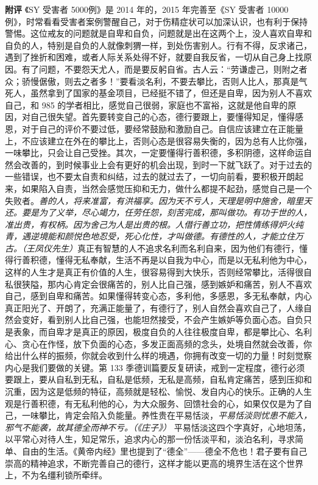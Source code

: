 \begin{case}
    \textbf{附评} 《SY 受害者 5000例》是 2014 年的，2015 年完善至《SY 受害者 10000 例》，时常看看受害者案例警醒自己，对于伤精症状可以加深认识，也有利于保持警惕。这位戒友的问题就是自卑和自负，问题就是出在这两个上，没人喜欢自卑和自负的人，特别是自负的人就像刺猬一样，到处伤害别人。行有不得，反求诸己，遇到了挫折和困难，或者人际关系处得不好，就要自我反省，一切从自己身上找原因。有了问题，不要怨天尤人，而是要反躬自省。古人云：“劳谦虚己，则附之者众；骄慢倨傲，则去之者多！”要看淡名利，不要去攀比，否则人比人，那真是气死人，虽然拿到了国家的基金项目，已经挺不错了，但还是自卑，因为别人不喜欢自己，和 985 的学者相比，感觉自己很弱，家庭也不富裕，这就是他自卑的原因，对自己很失望。首先要转变自己的心态，德行要跟上，要懂得知足，懂得感恩，对于自己的评价不要过低，要经常鼓励和激励自己。自信应该建立在正能量上，不应该建立在外在的攀比上，否则心态是很容易失衡的，因为总有人比你强，一味攀比，只会让自己受挫。其次，一定要懂得行善积德，多积阴德，这样命运自然会改善的，到时候事业上会有更好的机会出现，到时一下就飞跃了。对于过去的一些错误，也不要太自责和纠结，过去的就过去了，一切向前看，要积极开朗起来，如果陷入自责，当然会感觉压抑和无力，做什么都提不起劲，感觉自己是一个失败者。\textit{善的人，将来准富，有洪福享。因为天不亏人，天理是明中施舍，暗里天还。要是为了义举，尽心竭力，任劳任怨，刻苦完成，那叫做功。有功于世的人，准出贵，有权柄。因为舍己为人是出贵的根。人借行善立功，把性情练得炉火纯青，遇逆境能和颜悦色地忍受，死心化性，才叫做德。有德性的人，才能立住万古。（王凤仪先生）}真正有智慧的人不追求名利而名利自来，因为他们有德行，懂得行善积德，懂得无私奉献，生活不再是以自我为中心，而是以无私利他为中心，这样的人生才是真正有价值的人生，很容易得到大快乐，否则经常攀比，活得很自私很狭隘，那内心肯定会很痛苦的，别人比自己强，感到嫉妒和痛苦，别人不喜欢自己，感到自卑和痛苦。如果懂得转变心态，多利他，多感恩，多无私奉献，内心真正阳光了、开朗了，充满正能量了，有德行了，别人自然会喜欢自己了，人缘自然会变好，看到别人比自己强，也能坦然接受，不会产生嫉妒等负面心态。自负只是表象，而自卑才是真正的原因，极度自负的人往往极度自卑，都是攀比心、名利心、贪心在作怪，放下负面的心态，多发正面高频的念头，处境自然就会改善，你给出什么样的振频，你就会收到什么样的境遇，你拥有改变一切的力量！时刻觉察内心是我们要做的关键。第 133 季德训篇要反复研读，戒到一定程度，德行必须要跟上，要从自私到无私，自私是低频，无私是高频，自私肯定痛苦，感到压抑和沉重，因为这是低频的特征，高频就是轻松、愉悦、发自内心的快乐。正确的人生观是行善积德，有无私利他的心，为大众服务、回馈社会的心，如果仅仅是为了自己，一味攀比，肯定会陷入负能量。养性贵在平易恬淡，\textit{平易恬淡则忧患不能入，邪气不能袭，故其德全而神不亏。（《庄子》）} 平易恬淡这四个字真好，心地坦荡，以平常心对待人生，知足常乐，追求内心的那一份恬淡平和，淡泊名利，寻求简单、自由的生活。《黄帝内经》里也提到了“德全”——德全不危也！君子要有自己崇高的精神追求，不断完善自己的德行，这样才能以更高的境界生活在这个世界上，不为名缰利锁所牵绊。
\end{case}

